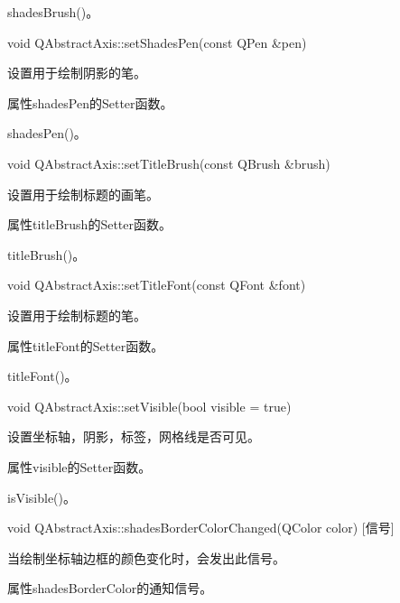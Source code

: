 \begin{seeAlso}
shadesBrush()。
\end{seeAlso}
    

void QAbstractAxis::setShadesPen(const QPen \&pen)

设置用于绘制阴影的笔。 

\begin{notice}
属性shadesPen的Setter函数。
\end{notice}
             
\begin{seeAlso}
shadesPen()。
\end{seeAlso}

void QAbstractAxis::setTitleBrush(const QBrush \&brush) 

设置用于绘制标题的画笔。

\begin{notice}
属性titleBrush的Setter函数。
\end{notice}
    
\begin{seeAlso}
titleBrush()。
\end{seeAlso}

void QAbstractAxis::setTitleFont(const QFont \&font) 

设置用于绘制标题的笔。

\begin{notice}
属性titleFont的Setter函数。
\end{notice}
        
\begin{seeAlso}
titleFont()。
\end{seeAlso}

void QAbstractAxis::setVisible(bool visible = true) 

设置坐标轴，阴影，标签，网格线是否可见。 

\begin{notice}
属性visible的Setter函数。
\end{notice}
            
\begin{seeAlso}
isVisible()。
\end{seeAlso}

void QAbstractAxis::shadesBorderColorChanged(QColor color) [信号] 

当绘制坐标轴边框的颜色变化时，会发出此信号。  

\begin{notice}
属性shadesBorderColor的通知信号。
\end{notice}

